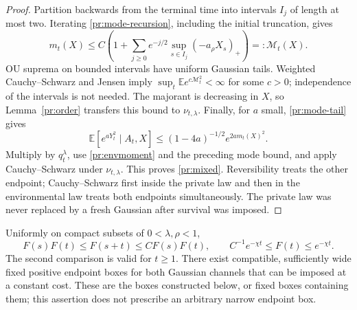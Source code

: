 \begin{proof}
Partition backwards from the terminal time into intervals $I_j$ of length
at most two. Iterating \eqref{pr:mode-recursion}, including the initial
truncation, gives
\begin{equation}
 m_t(X)\le C\left(1+\sum_{j\ge0}e^{-j/2}
                         \sup_{s\in I_j}(-a_\rho X_s)_+\right)=:\mathcal M_t(X).
 \label{pr:mode-majorant}
\end{equation}
OU suprema on bounded intervals have uniform Gaussian tails. Weighted
Cauchy--Schwarz and Jensen imply
$\sup_t\mathbb E e^{c\mathcal M_t^2}<\infty$ for some $c>0$; independence
of the intervals is not needed. The majorant is decreasing in $X$, so
Lemma~\ref{pr:order} transfers this bound to $\nu_{t,\lambda}$.
Finally, for $a$ small, \eqref{pr:mode-tail} gives
\[
 \mathbb E[e^{aY_t^2}\mid A_t,X]
 \le (1-4a)^{-1/2}e^{2am_t(X)^2}.
\]
Multiply by $q_t^\lambda$, use \eqref{pr:envmoment} and the preceding
mode bound, and apply Cauchy--Schwarz under $\nu_{t,\lambda}$.
This proves \eqref{pr:mixed}. Reversibility treats the other endpoint;
Cauchy--Schwarz first inside the private law and then in the environmental
law treats both endpoints simultaneously. The private law was never
replaced by a fresh Gaussian after survival was imposed.
\end{proof}

\begin{theorem}\label{pr:gaussian}
Uniformly on compact subsets of $0<\lambda,\rho<1$,
\begin{equation}
 F(s)F(t)\le F(s+t)\le C F(s)F(t),\qquad
 C^{-1}e^{-\chi t}\le F(t)\le e^{-\chi t}.                  \label{pr:quasimult}
\end{equation}
The second comparison is valid for $t\ge1$. There exist compatible,
sufficiently wide fixed positive endpoint boxes for both Gaussian
channels that can be imposed at a constant cost. These are the boxes
constructed below, or fixed boxes containing them; this assertion does
not prescribe an arbitrary narrow endpoint box.
\end{theorem}

